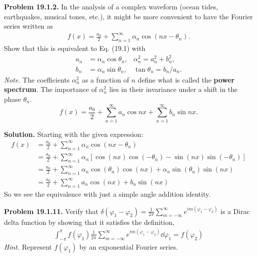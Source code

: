 \documentclass{article}
\begin{document}
\hrulefill

\textbf{Problem 19.1.2.} In the analysis of a complex waveform (ocean tides, earthquakes, musical tones, etc.), it might be more convenient to have the Fourier series written as
\begin{equation*}
\begin{aligned}
    f(x)= \frac{a_0}{2} + \sum_{n=1}^\infty \alpha_n\cos(nx-\theta_n).
\end{aligned}
\end{equation*}
Show that this is equivalent to Eq. (19.1) with
\begin{equation*}
\begin{aligned}
    a_n &= \alpha_n\cos\theta_n,&\alpha_n^2 = a_n^2 + b_n^2, \\
    b_n &= \alpha_n\sin\theta_n,&\tan\theta_n = b_n/a_n.
\end{aligned}
\end{equation*}
\textit{Note.} The coefficients $\alpha_n^2$ as a function of $n$ define what is called the \textbf{power spectrum}.
The importance of $\alpha_n^2$ lies in their invariance under a shift in the phase $\theta_n$.
\begin{equation}
    f(x) = \frac{a_0}{2} + \sum_{n=1}^\infty a_n\cos nx + \sum_{n=1}^\infty b_n \sin nx. \tag{19.1}\label{eq:19.1}
\end{equation}

\textbf{Solution.} Starting with the given expression:
\begin{equation*}
\begin{aligned}
    f(x) &= \frac{a_0}{2} + \sum_{n=1}^\infty \alpha_n\cos(nx-\theta_n) \\
    &= \frac{a_0}{2} + \sum_{n=1}^\infty \alpha_n \left[\cos(nx)\cos(-\theta_n) - \sin(nx)\sin(-\theta_n)\right] \\
    &= \frac{a_0}{2} + \sum_{n=1}^\infty \alpha_n \cos(\theta_n) \cos(nx) + \alpha_n \sin(\theta_n) \sin(nx) \\
    &= \frac{a_0}{2} + \sum_{n=1}^\infty a_n\cos(nx) + b_n \sin(nx)
\end{aligned}
\end{equation*}
So we see the equivalence with just a simple angle addition identity.

\hrulefill

\textbf{Problem 19.1.11.} Verify that $\delta(\varphi_1-\varphi_2) = \frac{1}{2\pi}\sum_{m=-\infty}^\infty e^{im(\varphi_1-\varphi_2)}$ is a Dirac delta function by showing that it satisfies the definition,
\begin{equation*}
\begin{aligned}
    \int_{-\pi}^\pi f(\varphi_1)\frac{1}{2\pi}\sum_{m=-\infty}^\infty e^{im(\varphi_1-\varphi_2)}\dd\varphi_1 = f(\varphi_2)
\end{aligned}
\end{equation*}
\textit{Hint.} Represent $f(\varphi_1)$ by an exponential Fourier series.
\end{document}
